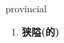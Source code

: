 
\begin{frame}
{\huge provincial}
\begin{center}
\begin{enumerate}\Large
  \item \textbf{狭隘(的)}
\end{enumerate}
\end{center}
\end{frame}
